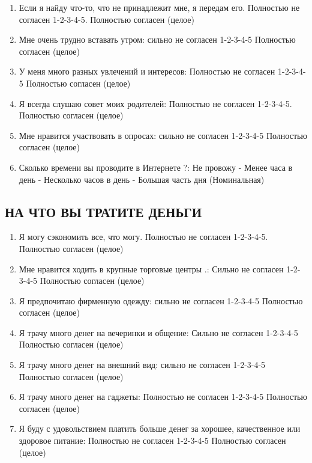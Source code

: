 \documentclass[11pt]{article}
\begin{document}
\begin{enumerate}
\item Если я найду что-то, что не принадлежит мне, я передам его. Полностью не согласен 1-2-3-4-5. Полностью согласен (целое)
\item Мне очень трудно вставать утром: сильно не согласен 1-2-3-4-5 Полностью согласен (целое)
\item У меня много разных увлечений и интересов: Полностью не согласен 1-2-3-4-5 Полностью согласен (целое)
\item Я всегда слушаю совет моих родителей: Полностью не согласен 1-2-3-4-5. Полностью согласен (целое)
\item Мне нравится участвовать в опросах: сильно не согласен 1-2-3-4-5 Полностью согласен (целое)
\item Сколько времени вы проводите в Интернете ?: Не провожу - Менее часа в день - Несколько часов в день - Большая часть дня (Номинальная)
\end{enumerate}
\subsection{НА ЧТО ВЫ ТРАТИТЕ ДЕНЬГИ}
\begin{enumerate}
\item Я могу сэкономить все, что могу. Полностью не согласен 1-2-3-4-5. Полностью согласен (целое)
\item Мне нравится ходить в крупные торговые центры .: Сильно не согласен 1-2-3-4-5 Полностью согласен (целое)
\item Я предпочитаю фирменную одежду: сильно не согласен 1-2-3-4-5 Полностью согласен (целое)
\item Я трачу много денег на вечеринки и общение: Сильно не согласен 1-2-3-4-5 Полностью согласен (целое)
\item Я трачу много денег на внешний вид: сильно не согласен 1-2-3-4-5 Полностью согласен (целое)
\item Я трачу много денег на гаджеты: Полностью не согласен 1-2-3-4-5 Полностью согласен (целое)
\item Я буду с удовольствием  платить больше денег за хорошее, качественное или здоровое питание: Полностью не согласен 1-2-3-4-5 Полностью согласен (целое)
\end{enumerate}
\end{document}
